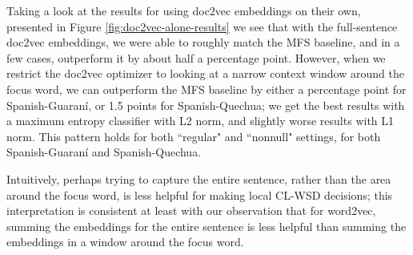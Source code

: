 Taking a look at the results for using doc2vec embeddings on their own,
presented in Figure \ref{fig:doc2vec-alone-results} we see that with the
full-sentence doc2vec embeddings, we were able to roughly match the MFS
baseline, and in a few cases, outperform it by about half a percentage point.
However, when we restrict the doc2vec optimizer to looking at a narrow context
window around the focus word, we can outperform the MFS baseline by either a
percentage point for Spanish-Guaraní, or 1.5 points for Spanish-Quechua; we get
the best results with a maximum entropy classifier with L2 norm, and slightly
worse results with L1 norm. This pattern holds for both ``regular" and
``nonnull" settings, for both Spanish-Guaraní and Spanish-Quechua.

Intuitively, perhaps trying to capture the entire sentence, rather than the
area around the focus word, is less helpful for making local CL-WSD decisions;
this interpretation is consistent at least with our observation that for
word2vec, summing the embeddings for the entire sentence is less helpful than
summing the embeddings in a window around the focus word.


